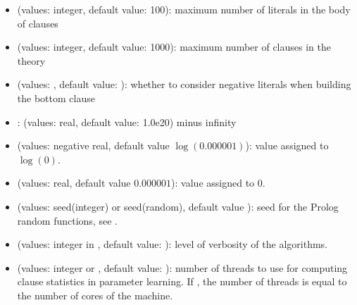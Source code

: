 \documentclass[letterpaper,10pt,english]{sphinxmanual}
\begin{document}
\begin{itemize}
\item {} 
\sphinxAtStartPar
{} (values: integer, default value: 100): maximum number of literals in the body of clauses

\item {} 
\sphinxAtStartPar
{} (values: integer, default value: 1000): maximum number of clauses in the theory

\item {} 
\sphinxAtStartPar
{} (values: , default value: ): whether to consider negative literals when building the bottom clause

\item {} 
\sphinxAtStartPar
{}: (values: real, default value: \sphinxhyphen{}1.0e20) minus infinity

\item {} 
\sphinxAtStartPar
{} (values: negative real, default value \(\log(0.000001)\)): value assigned to \(\log(0)\).

\item {} 
\sphinxAtStartPar
{} (values: real, default value \(0.000001\)): value assigned to \(0\).

\item {} 
\sphinxAtStartPar
{} (values: seed(integer) or seed(random), default value ): seed for the Prolog random functions, see  .

\item {} 
\sphinxAtStartPar
{} (values: integer in \sphinxcode{\sphinxupquote{{[}1,4{]}}}, default value: ): level of verbosity of the algorithms.

\item {} 
\sphinxAtStartPar
{} (values: integer or , default value: ): number of threads to use for computing clause statistics in parameter learning. If , the number of threads is equal to the number of cores of the machine.

\end{itemize}
\end{document}
